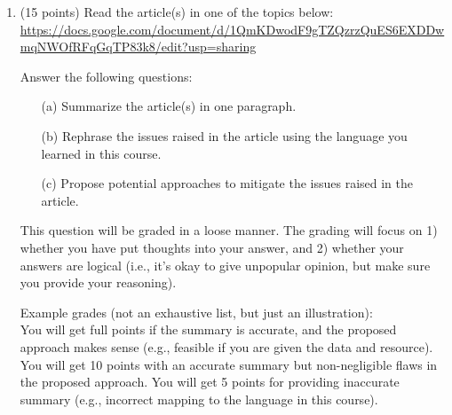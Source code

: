 \documentclass[11pt]{article}
\begin{document}
\begin{enumerate}
\item (15 points) Read the article(s) in one of the topics below:\\
\url{https://docs.google.com/document/d/1QmKDwodF9gTZQzrzQuES6EXDDwmqNWOfRFqGqTP83k8/edit?usp=sharing}

Answer the following questions:
\begin{itemize}
    \item[(a)] Summarize the article(s) in one paragraph.
    \item[(b)] Rephrase the issues raised in the article using the language you learned in this course.
    \item[(c)] Propose potential approaches to mitigate the issues raised in the article.
\end{itemize}

This question will be graded in a loose manner.
The grading will focus on 
1) whether you have put thoughts into your answer, and
2) whether your answers are logical (i.e., it's okay to give unpopular opinion, but make sure you provide your reasoning).

Example grades (not an exhaustive list, but just an illustration):\\
You will get full points if the summary is accurate, and the proposed approach makes sense (e.g., feasible if you are given the data and resource). 
You will get 10 points with an accurate summary but non-negligible flaws in the proposed approach.  
You will get 5 points for providing inaccurate summary (e.g., incorrect mapping to the language in this course).

\end{enumerate}

\end{document}
